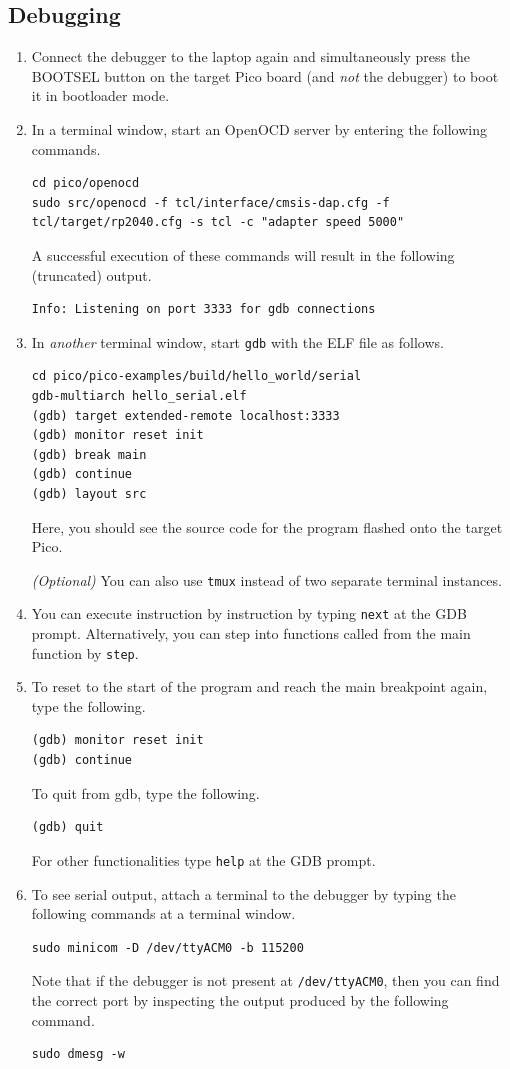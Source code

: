 \subsection{Debugging}
\begin{enumerate}
    \item Connect the debugger to the laptop again and simultaneously press the
    BOOTSEL button on the target Pico board (and \emph{not} the debugger) to
    boot it in bootloader mode.
    \item In a terminal window, start an OpenOCD server by entering the
    following commands.
    \begin{lstlisting}
cd pico/openocd
sudo src/openocd -f tcl/interface/cmsis-dap.cfg -f tcl/target/rp2040.cfg -s tcl -c "adapter speed 5000"
    \end{lstlisting}
    A successful execution of these commands will result in the following
    (truncated) output.
    \begin{lstlisting}
Info: Listening on port 3333 for gdb connections
    \end{lstlisting}
    \item In \emph{another} terminal window, start \texttt{gdb} with the ELF
    file as follows.
    \begin{lstlisting}
cd pico/pico-examples/build/hello_world/serial
gdb-multiarch hello_serial.elf
(gdb) target extended-remote localhost:3333
(gdb) monitor reset init
(gdb) break main
(gdb) continue
(gdb) layout src
    \end{lstlisting}
    Here, you should see the source code for the program flashed onto the target
    Pico.

    \emph{(Optional)} You can also use \texttt{tmux} instead of two separate
    terminal instances.
    \item You can execute instruction by instruction by typing \texttt{next} at
    the GDB prompt. Alternatively, you can step into functions called from the
    main function by \texttt{step}. 
    \item To reset to the start of the program and reach the main breakpoint
    again, type the following.
    \begin{lstlisting}
(gdb) monitor reset init
(gdb) continue
    \end{lstlisting}
    To quit from gdb, type the following.
    \begin{lstlisting}
(gdb) quit
    \end{lstlisting}
    For other functionalities type \texttt{help} at the GDB
    prompt.
    \item To see serial output, attach a terminal to the debugger by typing the
    following commands at a terminal window.
    \begin{lstlisting}
sudo minicom -D /dev/ttyACM0 -b 115200
    \end{lstlisting}
    Note that if the debugger is not present at \texttt{/dev/ttyACM0}, then you
    can find the correct port by inspecting the output produced by the
    following command.
    \begin{lstlisting}
sudo dmesg -w
    \end{lstlisting}
\end{enumerate}
